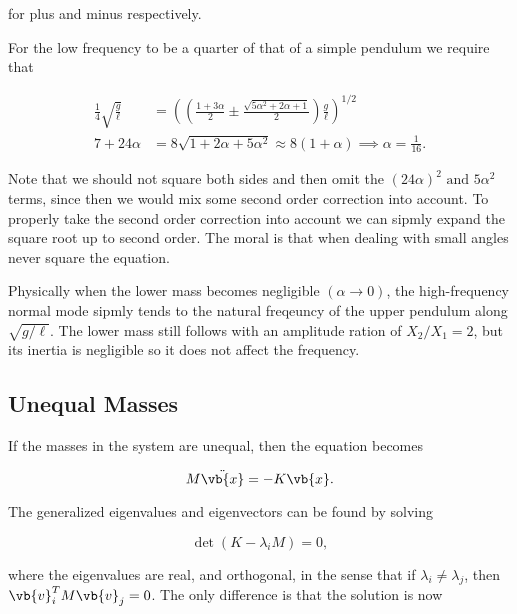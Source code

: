 \documentclass[a4paper,12pt]{report}
\begin{document}
{for plus and minus respectively.

For the low frequency to be a quarter of that of a simple pendulum we require that 

\begin{equation}
	\begin{aligned} 
	\frac{1}{4} \sqrt{\frac{g}{\ell }} &= \left( \left( \frac{1+3 \alpha }{2} \pm \frac{\sqrt{5 \alpha ^2+2\alpha +1} }{2} \right)  \frac{g}{\ell } \right)^{1/2}\\
	7+24 \alpha &= 8\sqrt{1+2 \alpha + 5 \alpha ^2} \approx 8 (1+\alpha ) \implies \alpha = \frac{1}{16}. 
	\end{aligned}   
\end{equation}

Note that we should not square both sides and then omit the \((24 \alpha )^2 \text { and } 5 \alpha ^2\) terms, since then we would mix some second order correction into account. To properly take the second order correction into account we can sipmly expand the square root up to second order. The moral is that when dealing with small angles never square the equation. 

Physically when the lower mass becomes negligible \((\alpha \to 0)\), the high-frequency normal mode sipmly tends to the natural freqeuncy of the upper pendulum along \(\sqrt{g /\ell } \). The lower mass still follows with an amplitude ration of \(X_2 /X_1 = 2\), but its inertia is negligible so it does not affect the frequency.   
} 


\subsection{Unequal Masses}

If the masses in the system are unequal, then the equation becomes 

\begin{equation}
    M \ddot{\vb{x} } = -K\vb{x}. \label{normal2} 
\end{equation}

The generalized eigenvalues and eigenvectors can be found by solving 

\begin{equation}
    \det (K-\lambda _{i}M ) = 0,
\end{equation}

where the eigenvalues are real, and orthogonal, in the sense that if \(\lambda _{i} \neq \lambda _{j}  \), then \(\vb{v} _{i}^T M \vb{v} _{j}  =0\). The only difference is that the solution is now
\end{document}
